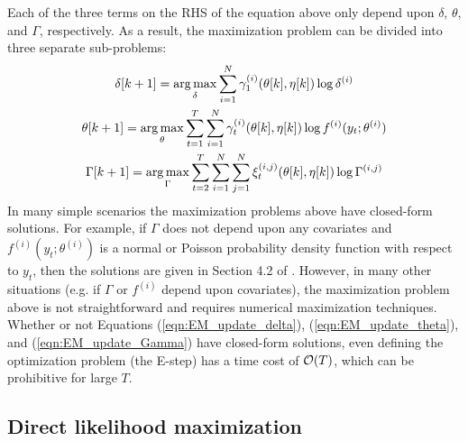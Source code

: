 Each of the three terms on the RHS of the equation above only depend upon $\delta$, $\theta$, and $\Gamma$, respectively. As a result, the maximization problem can be divided into three separate sub-problems:
%
\begin{gather}
    \delta[k+1] = \operatorname*{arg\,max}_{\delta} \sum_{i=1}^N \gamma^{(i)}_1(\theta[k],\eta[k]) \log \delta^{(i)} \label{eqn:EM_update_delta} \\
    \theta[k+1] = \operatorname*{arg\,max}_{\theta} \sum_{t = 1}^T \sum_{i=1}^N \gamma^{(i)}_t(\theta[k],\eta[k]) \log f^{(i)}(y_t;\theta^{(i)}) \label{eqn:EM_update_theta} \\
    \Gamma[k+1] = \operatorname*{arg\,max}_{\Gamma} \sum_{t=2}^{T} \sum_{i=1}^N \sum_{j=1}^N \xi_t^{(i,j)}(\theta[k],\eta[k]) \log \Gamma^{(i,j)} \label{eqn:EM_update_Gamma}
\end{gather}
%
In many simple scenarios the maximization problems above have closed-form solutions. For example, if $\Gamma$ does not depend upon any covariates and $f^{(i)}(y_t;\theta^{(i)})$ is a normal or Poisson probability density function with respect to $y_t$, then the solutions are given in Section 4.2 of \citet{Zucchini:2016}. However, in many other situations (e.g. if $\Gamma$ or $f^{(i)}$ depend upon covariates), the maximization problem above is not straightforward and requires numerical maximization techniques. Whether or not Equations (\ref{eqn:EM_update_delta}), (\ref{eqn:EM_update_theta}), and (\ref{eqn:EM_update_Gamma}) have closed-form solutions, even defining the optimization problem (the E-step) has a time cost of $\mathcal{O}(T)$, which can be prohibitive for large $T$. 

\subsection{Direct likelihood maximization}

